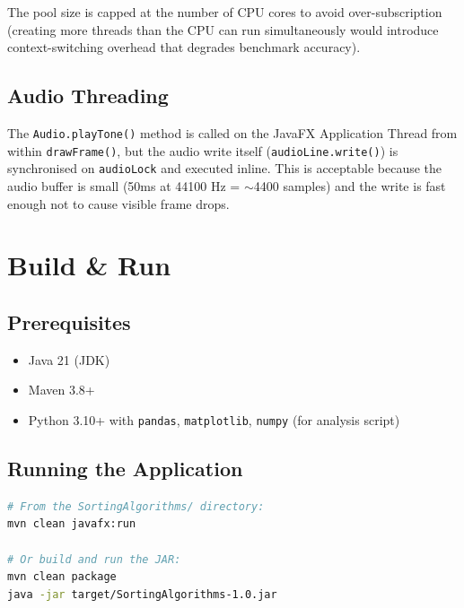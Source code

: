 \documentclass[12pt,a4paper]{article}
\begin{document}
The pool size is capped at the number of CPU cores to avoid over-subscription
(creating more threads than the CPU can run simultaneously would introduce
context-switching overhead that degrades benchmark accuracy).

\subsection{Audio Threading}

The \texttt{Audio.playTone()} method is called on the JavaFX Application Thread
from within \texttt{drawFrame()}, but the audio write itself (\texttt{audioLine.write()})
is synchronised on \texttt{audioLock} and executed inline. This is acceptable
because the audio buffer is small (50ms at 44100 Hz = $\sim$4400 samples)
and the write is fast enough not to cause visible frame drops.

\section{Build \& Run}

\subsection{Prerequisites}

\begin{itemize}[nosep]
    \item Java 21 (JDK)
    \item Maven 3.8+
    \item Python 3.10+ with \texttt{pandas}, \texttt{matplotlib},
          \texttt{numpy} (for analysis script)
\end{itemize}

\subsection{Running the Application}

\begin{lstlisting}[language=bash, style=pythonstyle,
                   caption={Build and run commands}]
# From the SortingAlgorithms/ directory:
mvn clean javafx:run

# Or build and run the JAR:
mvn clean package
java -jar target/SortingAlgorithms-1.0.jar
\end{lstlisting}
\end{document}
